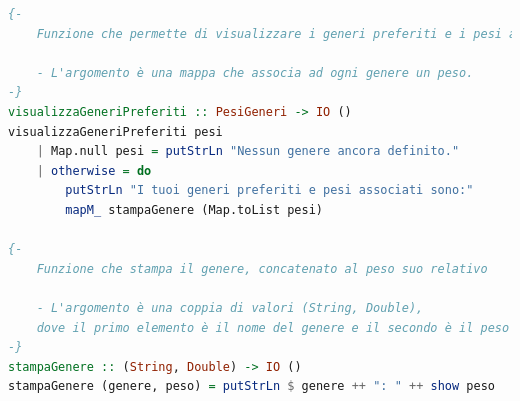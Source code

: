 \documentclass[a4paper,11pt]{article}
\begin{document}
\begin{lstlisting}[language=Haskell]
{-
    Funzione che permette di visualizzare i generi preferiti e i pesi associati.

    - L'argomento è una mappa che associa ad ogni genere un peso.
-}
visualizzaGeneriPreferiti :: PesiGeneri -> IO ()
visualizzaGeneriPreferiti pesi
    | Map.null pesi = putStrLn "Nessun genere ancora definito."
    | otherwise = do
        putStrLn "I tuoi generi preferiti e pesi associati sono:"
        mapM_ stampaGenere (Map.toList pesi)

{-
    Funzione che stampa il genere, concatenato al peso suo relativo

    - L'argomento è una coppia di valori (String, Double),
    dove il primo elemento è il nome del genere e il secondo è il peso associato.
-}
stampaGenere :: (String, Double) -> IO ()
stampaGenere (genere, peso) = putStrLn $ genere ++ ": " ++ show peso

    \end{lstlisting}

    \newpage
\end{document}
